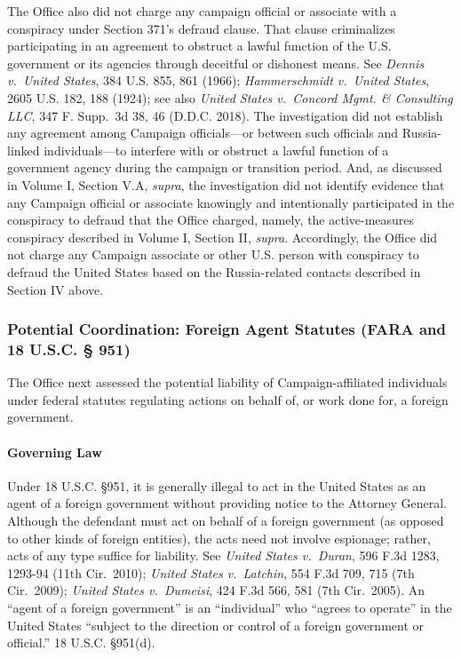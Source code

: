 The Office also did not charge any campaign official or associate with a conspiracy under Section 371's defraud clause.
That clause criminalizes participating in an agreement to obstruct a lawful function of the U.S. government or its agencies through deceitful or dishonest means.
See \textit{Dennis v.\ United States}, 384 U.S. 855, 861 (1966); \textit{Hammerschmidt v.\ United States}, 2605 U.S. 182, 188 (1924); see also \textit{United States v.\ Concord Mgmt. \& Consulting LLC}, 347 F. Supp.~3d 38, 46 (D.D.C. 2018).
The investigation did not establish any agreement among Campaign officials---or between such officials and Russia-linked individuals---to interfere with or obstruct a lawful function of a government agency during the campaign or transition period.
And, as discussed in Volume I, Section V.A, \textit{supra}, the investigation did not identify evidence that any Campaign official or associate knowingly and intentionally participated in the conspiracy to defraud that the Office charged, namely, the active-measures conspiracy described in Volume I, Section II, \textit{supra}.
Accordingly, the Office did not charge any Campaign associate or other U.S. person with conspiracy to defraud the United States based on the Russia-related contacts described in Section IV above.

\subsubsection{Potential Coordination: Foreign Agent Statutes (FARA and 18 U.S.C. § 951)}
The Office next assessed the potential liability of Campaign-affiliated individuals under federal statutes regulating actions on behalf of, or work done for, a foreign government.

\paragraph{Governing Law}
Under 18 U.S.C. \S 951, it is generally illegal to act in the United States as an agent of a foreign government without providing notice to the Attorney General.
Although the defendant must act on behalf of a foreign government (as opposed to other kinds of foreign entities), the acts need not involve espionage; rather, acts of any type suffice for liability.
See \textit{United States v.\ Duran}, 596 F.3d 1283, 1293-94 (11th Cir.~2010); \textit{United States v.\ Latchin}, 554 F.3d 709, 715 (7th Cir.~2009); \textit{United States v.\ Dumeisi}, 424 F.3d 566, 581 (7th Cir.~2005).
An ``agent of a foreign government'' is an ``individual'' who ``agrees to operate'' in the United States ``subject to the direction or control of a foreign government or official.'' 18 U.S.C. \S 951(d).

